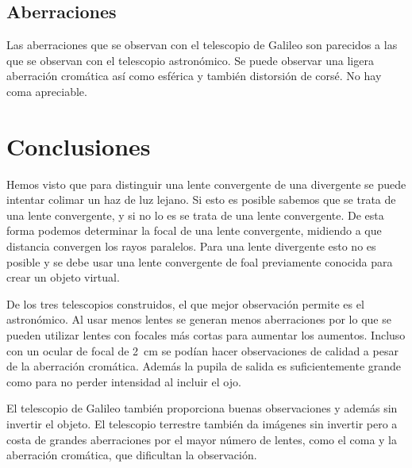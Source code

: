 \documentclass[12pt]{article}
\numberwithin{table}{section}
\numberwithin{figure}{section}
\numberwithin{equation}{section}
\begin{document}
\subsection{Aberraciones}
Las aberraciones que se observan con el telescopio de Galileo son parecidos a las que se observan con el telescopio astronómico. Se puede observar una ligera aberración cromática así como esférica y también distorsión de corsé. No hay coma apreciable.

\section{Conclusiones}
Hemos visto que para distinguir una lente convergente de una divergente se puede intentar colimar un haz de luz lejano. Si esto es posible sabemos que se trata de una lente convergente, y si no lo es se trata de una lente convergente. De esta forma podemos determinar la focal de una lente convergente, midiendo a que distancia convergen los rayos paralelos. Para una lente divergente esto no es posible y se debe usar una lente convergente de foal previamente conocida para crear un objeto virtual.

De los tres telescopios construidos, el que mejor observación permite es el astronómico. Al usar menos lentes se generan menos aberraciones por lo que se pueden utilizar lentes con focales más cortas para aumentar los aumentos. Incluso con un ocular de focal de \SI{2}{cm} se podían hacer observaciones de calidad a pesar de la aberración cromática. Además la pupila de salida es suficientemente grande como para no perder intensidad al incluir el ojo.

El telescopio de Galileo también proporciona buenas observaciones y además sin invertir el objeto. El telescopio terrestre también da imágenes sin invertir pero a costa de grandes aberraciones por el mayor número de lentes, como el coma y la aberración cromática, que dificultan la observación.
\end{document}

